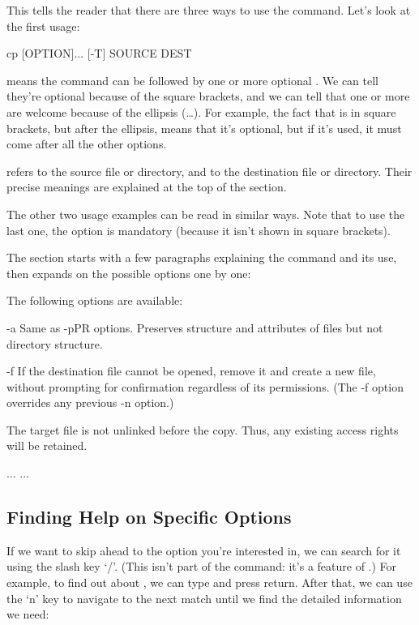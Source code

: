 This tells the reader that there are three ways to use the command.
Let's look at the first usage:

\begin{VerbOut}
cp [OPTION]... [-T] SOURCE DEST
\end{VerbOut}

\code{{[}OPTION{]}} means the  command can be followed by
one or more optional . We can tell
they're optional because of the square brackets, and we can tell that
one or more are welcome because of the ellipsis (\ldots{}). For example,
the fact that \code{{[}-T{]}} is in square brackets, but after the
ellipsis, means that it's optional, but if it's used, it must come after
all the other options.

 refers to the source file or directory, and
 to the destination file or directory. Their precise
meanings are explained at the top of the  section.

The other two usage examples can be read in similar ways. Note that to
use the last one, the  option is mandatory (because it isn't
shown in square brackets).

The  section starts with a few paragraphs explaining
the command and its use, then expands on the possible options one by
one:

\begin{VerbOut}
     The following options are available:

     -a    Same as -pPR options. Preserves structure and attributes of
           files but not directory structure.

     -f    If the destination file cannot be opened, remove it and create
           a new file, without prompting for confirmation regardless of
           its permissions.  (The -f option overrides any previous -n
           option.)

           The target file is not unlinked before the copy.  Thus, any
           existing access rights will be retained.

      ...  ...
\end{VerbOut}

\subsection*{Finding Help on Specific Options}

If we want to skip ahead to the option you're interested in, we can
search for it using the slash key `/'. (This isn't part of the
 command: it's a feature of .) For example, to
find out about , we can type  and press return.
After that, we can use the `n' key to navigate to the next match until
we find the detailed information we need:

